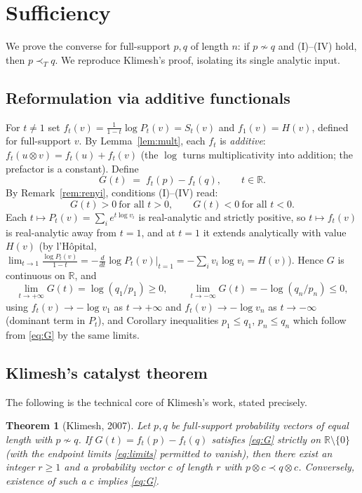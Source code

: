 \documentclass{amsart}
\theoremstyle{plain}
\newtheorem{theorem}{Theorem}
\theoremstyle{definition}
\newcommand{\R}{\mathbb{R}}
\newcommand{\maj}{\prec}
\newcommand{\trump}{\prec_T}
\begin{document}
\section{Sufficiency}\label{sec:suff}

We prove the converse for full-support $p,q$ of length $n$: if $p\not\sim q$ and
\textnormal{(I)--(IV)} hold, then $p\trump q$. We reproduce Klimesh's proof, isolating
its single analytic input.

\subsection{Reformulation via additive functionals}
For $t\ne1$ set $f_t(v)=\frac{1}{1-t}\log P_t(v)=S_t(v)$ and $f_1(v)=H(v)$, defined for
full-support $v$. By Lemma~\ref{lem:mult}, each $f_t$ is \emph{additive}:
$f_t(u\otimes v)=f_t(u)+f_t(v)$ (the $\log$ turns multiplicativity into addition; the
prefactor is a constant). Define
\[
   G(t)\;=\;f_t(p)-f_t(q),\qquad t\in\R .
\]
By Remark~\ref{rem:renyi}, conditions (I)--(IV) read:
\begin{equation}\label{eq:G}
   G(t)>0\ \text{for all }t>0,\qquad G(t)<0\ \text{for all }t<0 .
\end{equation}
Each $t\mapsto P_t(v)=\sum_i e^{t\log v_i}$ is real-analytic and strictly positive, so
$t\mapsto f_t(v)$ is real-analytic away from $t=1$, and at $t=1$ it extends
analytically with value $H(v)$ (by l'Hôpital,
$\lim_{t\to1}\frac{\log P_t(v)}{1-t}=-\frac{d}{dt}\log P_t(v)\big|_{t=1}
=-\sum_i v_i\log v_i=H(v)$). Hence $G$ is continuous on $\R$, and
\begin{equation}\label{eq:limits}
  \lim_{t\to+\infty}G(t)=\log(q_1/p_1)\ge0,\qquad
  \lim_{t\to-\infty}G(t)=-\log(q_n/p_n)\le0,
\end{equation}
using $f_t(v)\to-\log v_1$ as $t\to+\infty$ and $f_t(v)\to-\log v_n$ as $t\to-\infty$
(dominant term in $P_t$), and Corollary inequalities $p_1\le q_1$, $p_n\le q_n$ which
follow from \eqref{eq:G} by the same limits.

\subsection{Klimesh's catalyst theorem}
The following is the technical core of Klimesh's work, stated precisely.

\begin{theorem}[Klimesh, 2007]\label{thm:klimesh}
Let $p,q$ be full-support probability vectors of equal length with $p\not\sim q$. If
$G(t)=f_t(p)-f_t(q)$ satisfies \eqref{eq:G} \emph{strictly on $\R\setminus\{0\}$}
\textnormal{(}with the endpoint limits \eqref{eq:limits} permitted to vanish\textnormal{)},
then there exist an integer $r\ge1$ and a probability vector $c$ of length $r$ with
$p\otimes c\maj q\otimes c$. Conversely, existence of such a $c$ implies \eqref{eq:G}.
\end{theorem}
\end{document}
